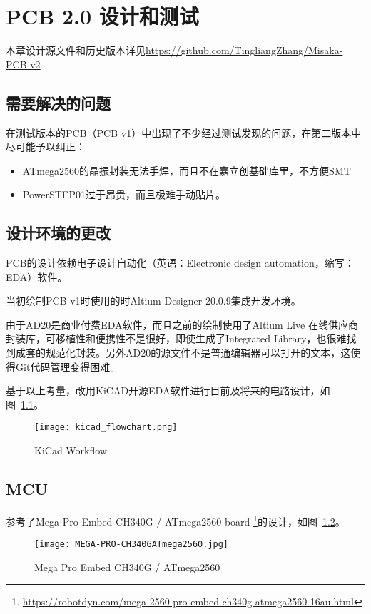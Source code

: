 \chapter{PCB 2.0 设计和测试}
\label{cha:PCB-v2}

本章设计源文件和历史版本详见\url{https://github.com/TingliangZhang/Misaka-PCB-v2}

\section{需要解决的问题}

在测试版本的PCB（PCB v1）中出现了不少经过测试发现的问题，在第二版本中尽可能予以纠正：

\begin{itemize}
    \item ATmega2560的晶振封装无法手焊，而且不在嘉立创基础库里，不方便SMT
    \item PowerSTEP01过于昂贵，而且极难手动贴片。
\end{itemize}

\section{设计环境的更改}

PCB的设计依赖电子设计自动化（英语：Electronic design automation，缩写：EDA）软件。

当初绘制PCB v1时使用的时Altium Designer 20.0.9集成开发环境。

由于AD20是商业付费EDA软件，而且之前的绘制使用了Altium Live 在线供应商封装库，可移植性和便携性不是很好，即使生成了Integrated Library，也很难找到成套的规范化封装。另外AD20的源文件不是普通编辑器可以打开的文本，这使得Git代码管理变得困难。

基于以上考量，改用KiCAD开源EDA软件进行目前及将来的电路设计，如图~\ref{fig:kicad_flowchart}。

\begin{figure}[htbp]
    \centering
    \texttt{[image: kicad\_flowchart.png]}
    \caption{KiCad Workflow}
    \label{fig:kicad_flowchart}
\end{figure}

\section{MCU}

参考了Mega Pro Embed CH340G / ATmega2560 board \footnote{\url{https://robotdyn.com/mega-2560-pro-embed-ch340g-atmega2560-16au.html}}的设计，如图~\ref{fig:MEGA-PRO-CH340GATmega2560}。

\begin{figure}[htbp]
    \centering
    \texttt{[image: MEGA-PRO-CH340GATmega2560.jpg]}
    \caption{Mega Pro Embed CH340G / ATmega2560}
    \label{fig:MEGA-PRO-CH340GATmega2560}
\end{figure}
